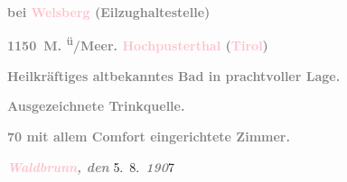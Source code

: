 \pstart
           \textcolor{gray}{\textbf{bei \textbf{\textcolor{pink}{Welsberg}{}\ledrightnote{\textcolor{pink}{Welsberg-Taisten}}} (Eilzughaltestelle) }}\pend
           
\pstart
           \textcolor{gray}{\textbf{1150 M. \textsuperscript{ü}/Meer. \hspace*{1.5em}\textcolor{pink}{Hochpusterthal}{}\ledrightnote{\textcolor{pink}{Pustertal}} (\textcolor{pink}{Tirol}{}\ledrightnote{\textcolor{pink}{Tirol}})}}\pend
           
\pstart
           \textcolor{gray}{\textbf{Heilkräftiges altbekanntes Bad in prachtvoller Lage.}}\pend
           
\pstart
           \textcolor{gray}{\textbf{\textbf{Ausgezeichnete Trinkquelle}.}}\pend
           
\pstart
           \textcolor{gray}{\textbf{70 mit allem Comfort eingerichtete Zimmer.}}\pend
           
\pstart
           \raggedleft{}\textcolor{gray}{\textbf{\emph{\textcolor{pink}{Waldbrunn}{}\ledrightnote{\textcolor{pink}{Welsberg-Taisten}}, den}}}{ }5. 8. \textcolor{gray}{\textbf{\emph{190}}}7\pend
           
